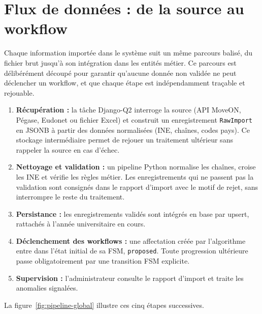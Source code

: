 \section{Flux de données : de la source au workflow}

Chaque information importée dans le système suit un même parcours balisé, du fichier brut jusqu’à son intégration dans les entités métier. Ce parcours est délibérément découpé pour garantir qu’aucune donnée non validée ne peut déclencher un workflow, et que chaque étape est indépendamment traçable et rejouable.

\begin{enumerate}
  \item \textbf{Récupération :} la tâche Django-Q2 interroge la source (API MoveON, Pégase, Eudonet ou fichier Excel) et construit un enregistrement \texttt{RawImport} en JSONB à partir des données normalisées (INE, chaînes, codes pays). Ce stockage intermédiaire permet de rejouer un traitement ultérieur sans rappeler la source en cas d'échec.
  \item \textbf{Nettoyage et validation :} un pipeline Python normalise les chaînes, croise les INE et vérifie les règles métier. Les enregistrements qui ne passent pas la validation sont consignés dans le rapport d’import avec le motif de rejet, sans interrompre le reste du traitement.
  \item \textbf{Persistance :} les enregistrements validés sont intégrés en base par upsert, rattachés à l’année universitaire en cours.
  \item \textbf{Déclenchement des workflows :} une affectation créée par l’algorithme entre dans l’état initial de sa FSM, \texttt{proposed}. Toute progression ultérieure passe obligatoirement par une transition FSM explicite.
  \item \textbf{Supervision :} l’administrateur consulte le rapport d’import et traite les anomalies signalées.
\end{enumerate}

La figure~\ref{fig:pipeline-global} illustre ces cinq étapes successives.


